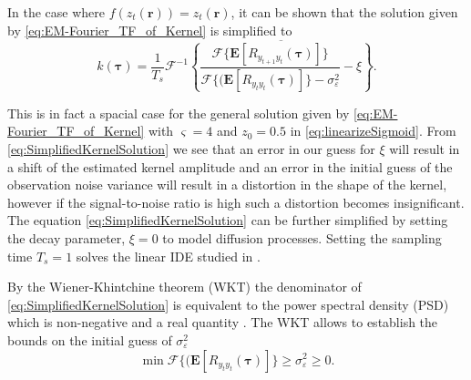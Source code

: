 \documentclass[10pt,twocolumn,twoside]{IEEEtran}
\newcommand{\parham}[1]{\textsf{\emph{\textbf{\textcolor{blue}{#1}}}}}
\begin{document}
In the case where $f(z_t(\mathbf{r}))=z_t(\mathbf{r})$, it can be shown that the solution given by \eqref{eq:EM-Fourier_TF_of_Kernel} is simplified to  
\begin{equation}\label{eq:SimplifiedKernelSolution}
	k(\boldsymbol\tau) = \frac{1}{T_s }\mathcal{F}^{-1}\overline{\left\{\frac{\mathcal{F}\{\mathbf{E}[R_{y_{t+1}y_t}(\boldsymbol{\tau})]\}}{\mathcal{F}\{(\mathbf{E}\left[R_{y_ty_t}(\boldsymbol\tau)\right]\} - \sigma_{\varepsilon}^2 }-\xi\right\}}.
\end{equation}
   
This is in fact a spacial case for the general solution given by \eqref{eq:EM-Fourier_TF_of_Kernel} with $\varsigma=4$ and $z_0=0.5$ in \eqref{eq:linearizeSigmoid}. From \eqref{eq:SimplifiedKernelSolution} we see that an error in our guess for $\xi$ will result in a shift of the estimated kernel amplitude and an error in the initial guess of  the observation noise variance will result in a distortion in the shape of the kernel, however if the signal-to-noise ratio is high such a distortion becomes insignificant.  The equation \eqref{eq:SimplifiedKernelSolution}   can be further simplified by setting the decay parameter, $\xi=0$ to model diffusion processes. Setting  the sampling time $T_s=1$ solves the linear IDE studied in \cite{Dewar2009, Scerri2009}.  

By the Wiener-Khintchine theorem (WKT) the denominator of \eqref{eq:SimplifiedKernelSolution} is equivalent to the power spectral density (PSD) which is non-negative and a real quantity \cite{Ricker2003}. The WKT allows to establish the bounds on the initial guess of $\sigma_{\varepsilon}^2$
\begin{equation}\label{eq:BoundOnObsVariance}   
  \min\mathcal{F}\{(\mathbf{E}\left[R_{y_ty_t}(\boldsymbol\tau)\right]\}\ge\sigma_{\varepsilon}^2\ge0. 
\end{equation}
\end{document}
